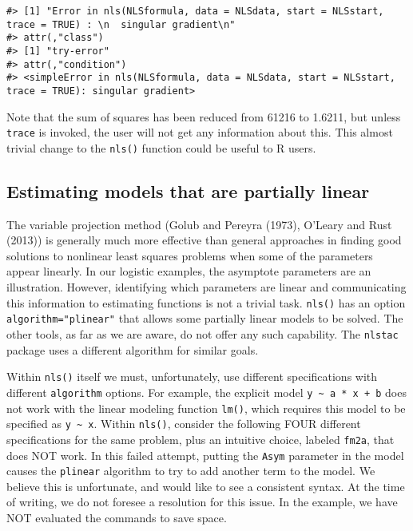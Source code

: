 \begin{verbatim}
#> [1] "Error in nls(NLSformula, data = NLSdata, start = NLSstart, trace = TRUE) : \n  singular gradient\n"
#> attr(,"class")
#> [1] "try-error"
#> attr(,"condition")
#> <simpleError in nls(NLSformula, data = NLSdata, start = NLSstart, trace = TRUE): singular gradient>
\end{verbatim}

Note that the sum of squares has been reduced from 61216 to 1.6211, but
unless \texttt{trace} is invoked, the user will not get any information about this.
This almost trivial change to the \texttt{nls()} function could be
useful to R users.

\hypertarget{estimating-models-that-are-partially-linear}{%
\subsection{Estimating models that are partially linear}\label{estimating-models-that-are-partially-linear}}

The variable projection method (Golub and Pereyra (1973), O'Leary and Rust (2013)) is
generally much more effective than general approaches in finding good solutions
to nonlinear least squares
problems when some of the parameters appear linearly. In our logistic examples,
the asymptote parameters are an illustration. However, identifying which parameters
are linear and communicating this information to estimating functions
is not a trivial task. \texttt{nls()} has an option \texttt{algorithm="plinear"} that allows some partially linear
models to be solved. The other tools, as far as we are aware, do not offer any
such capability. The \texttt{nlstac} package uses a different algorithm for similar goals.

Within \texttt{nls()} itself we must, unfortunately, use
different specifications with different \texttt{algorithm} options.
For example, the explicit model \texttt{y\ \textasciitilde{}\ a\ *\ x\ +\ b} does not work with the linear
modeling function \texttt{lm()}, which requires this model to be specified as \texttt{y\ \textasciitilde{}\ x}.
Within \texttt{nls()}, consider the following FOUR different specifications for the same
problem, plus an intuitive choice, labeled \texttt{fm2a}, that does NOT work.
In this failed attempt, putting the \texttt{Asym} parameter in the model causes the
\texttt{plinear} algorithm
to try to add another term to the model. We believe this is unfortunate, and would
like to see a consistent syntax. At the time of writing, we do
not foresee a resolution for this issue. In the example, we have NOT evaluated
the commands to save space.

